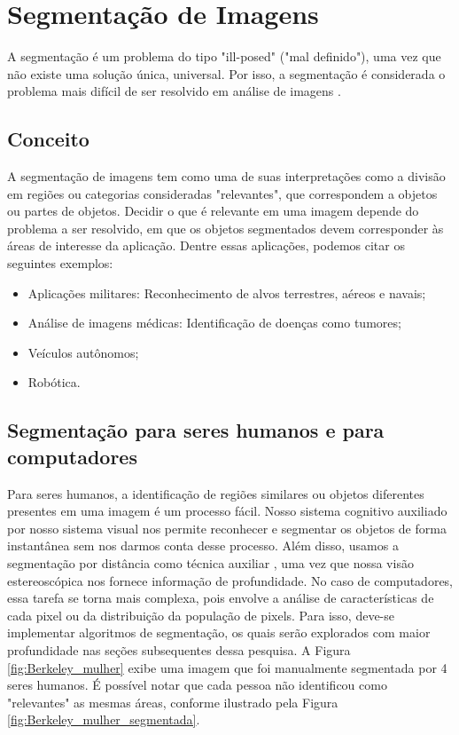 \chapter{Segmentação de Imagens}\label{cap:segmentacao}
A segmentação é um problema do tipo "ill-posed" ("mal definido"), uma vez que não existe uma solução única, universal. Por isso, a segmentação é considerada o problema mais difícil de ser resolvido em análise de imagens \citep{Poggio1985}.

\section{Conceito}
A segmentação de imagens tem como uma de suas interpretações como a divisão em regiões ou categorias consideradas "relevantes", que correspondem a objetos ou partes de objetos. Decidir o que é relevante em uma imagem depende do problema a ser resolvido, em que os objetos segmentados devem corresponder às áreas de interesse da aplicação. Dentre essas aplicações, podemos citar os seguintes exemplos:

\begin{itemize}
\item Aplicações militares: Reconhecimento de alvos terrestres, aéreos e navais;
\item Análise de imagens médicas: Identificação de doenças como tumores;
\item Veículos autônomos;
\item Robótica.
\end{itemize}

\section{Segmentação para seres humanos e para computadores}\label{sec:segmenthm}
Para seres humanos, a identificação de regiões similares ou objetos diferentes presentes em uma imagem é um processo fácil. Nosso sistema cognitivo auxiliado por nosso sistema visual nos permite reconhecer e segmentar os objetos de forma instantânea sem nos darmos conta desse processo. Além disso, usamos a segmentação por distância como técnica auxiliar , uma vez que nossa visão estereoscópica nos fornece informação de profundidade.
No caso de computadores, essa tarefa se torna mais complexa, pois envolve a análise de características de cada pixel ou da distribuição da população de pixels. Para isso, deve-se implementar algoritmos de segmentação, os quais serão explorados com maior profundidade nas seções subsequentes dessa pesquisa. A Figura \ref{fig:Berkeley_mulher} exibe uma imagem que foi manualmente segmentada por 4 seres humanos. É possível notar que cada pessoa não identificou como "relevantes" as mesmas áreas, conforme ilustrado pela Figura \ref{fig:Berkeley_mulher_segmentada}. 

